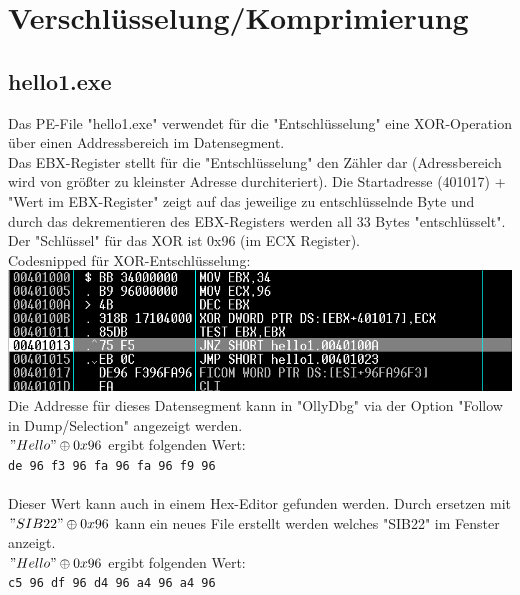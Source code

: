 \documentclass{article}
\begin{document}
	\pagebreak
	
	\section{Verschlüsselung/Komprimierung}
	\subsection{hello1.exe}
	Das PE-File "hello1.exe" verwendet für die "Entschlüsselung" eine XOR-Operation über einen Addressbereich im Datensegment.\\
	Das EBX-Register stellt für die "Entschlüsselung" den Zähler dar (Adressbereich wird von größter zu kleinster Adresse durchiteriert). Die Startadresse (401017) + "Wert im EBX-Register" zeigt auf das jeweilige zu entschlüsselnde Byte und durch das dekrementieren des EBX-Registers werden all 33 Bytes "entschlüsselt".\\
	Der "Schlüssel" für das XOR ist 0x96 (im ECX Register).\\
	Codesnipped für XOR-Entschlüsselung:\\
	\includegraphics[width=0.5\linewidth]{pictures/hello1-important code-snipped}\\
	Die Addresse für dieses Datensegment kann in "OllyDbg" via der Option "Follow in Dump/Selection" angezeigt werden.\\
	\("Hello" \oplus 0x96\) ergibt folgenden Wert:\\
	\texttt{de 96 f3 96 fa 96 fa 96 f9 96}\\
	\\
	Dieser Wert kann auch in einem Hex-Editor gefunden werden. Durch ersetzen mit \("SIB22" \oplus 0x96\) kann ein neues File erstellt werden welches "SIB22" im Fenster anzeigt.\\
	\("Hello" \oplus 0x96\) ergibt folgenden Wert:\\
	\texttt{c5 96 df 96 d4 96 a4 96 a4 96}\\
	
\end{document}

